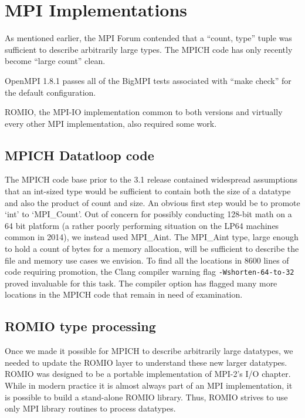
\section{MPI Implementations}
As mentioned earlier, the MPI Forum contended that a ``count, type''
tuple was sufficient to describe
arbitrarily large types.  The MPICH code has only recently become
``large count'' clean.

OpenMPI 1.8.1 passes all of the BigMPI tests associated with
``make check'' for the default configuration.

ROMIO, the MPI-IO implementation common to both versions and
virtually every other MPI implementation, also required some work.

\subsection{MPICH Datatloop code}
The MPICH code base prior to the
3.1 release contained widespread assumptions that an int-sized type
would be sufficient to contain both the size of a datatype and also the product
of count and size.   An obvious first step would be to promote `int' to `MPI\_Count'.
Out of concern for possibly conducting 128-bit math on a 64 bit platform (a
rather poorly performing situation on the LP64 machines common in 2014),
we instead used MPI\_Aint.  The MPI\_Aint type, large enough to hold a
count of bytes for a memory allocation, will be sufficient to describe the file
and memory use cases we envision.  To find all the locations in 8600 lines of
code requiring promotion, the Clang compiler warning flag
\texttt{-Wshorten-64-to-32} proved invaluable for this task.  The compiler option has
flagged many more
locations in the MPICH code that remain in need of examination.

\subsection{ROMIO type processing}

Once we made it possible for MPICH to describe arbitrarily large datatypes, we
needed to update the ROMIO layer to understand these new larger datatypes.
ROMIO \cite{thakur:mpi-io-implement} was designed to be a portable
 implementation of MPI-2's I/O
chapter.  While in modern practice it is almost always part of an MPI
implementation, it is possible to build a stand-alone ROMIO library.  Thus,
ROMIO strives to use only MPI library routines to process datatypes.

